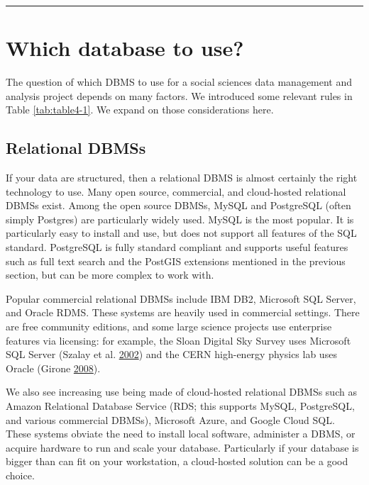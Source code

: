 \documentclass[]{krantz}
\begin{document}
\begin{center}\rule{0.5\linewidth}{\linethickness}\end{center}

\section{Which database to use?}\label{which-database-to-use}

The question of which DBMS to use for a social sciences data management
and analysis project depends on many factors. We introduced some
relevant rules in Table \ref{tab:table4-1}. We expand on those
considerations here.

\subsection{Relational DBMSs}\label{relational-dbmss-1}

If your data are structured, then a relational DBMS is almost certainly
the right technology to use. Many open source, commercial, and
cloud-hosted relational DBMSs exist. Among the open source DBMSs, MySQL
and PostgreSQL (often simply Postgres) are particularly widely used.
MySQL is the most popular. It is particularly easy to install and use,
but does not support all features of the SQL standard. PostgreSQL is
fully standard compliant and supports useful features such as full text
search and the PostGIS extensions mentioned in the previous section, but
can be more complex to work with.

Popular commercial relational DBMSs include IBM DB2, Microsoft SQL
Server, and Oracle RDMS. These systems are heavily used in commercial
settings. There are free community editions, and some large science
projects use enterprise features via licensing: for example, the Sloan
Digital Sky Survey uses Microsoft SQL Server (Szalay et al.
\protect\hyperlink{ref-szalay2002sdss}{2002}) and the CERN high-energy
physics lab uses Oracle (Girone
\protect\hyperlink{ref-girone2008cern}{2008}).

We also see increasing use being made of cloud-hosted relational DBMSs
such as Amazon Relational Database Service (RDS; this supports MySQL,
PostgreSQL, and various commercial DBMSs), Microsoft Azure, and Google
Cloud SQL. These systems obviate the need to install local software,
administer a DBMS, or acquire hardware to run and scale your database.
Particularly if your database is bigger than can fit on your
workstation, a cloud-hosted solution can be a good choice.
\end{document}
